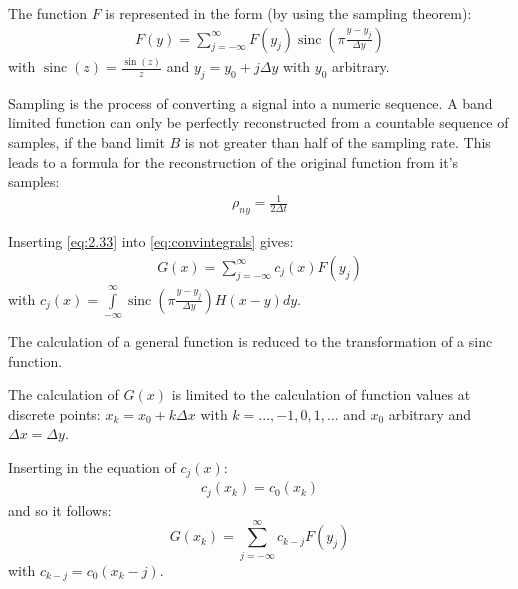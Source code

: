 \begin{compactenum}[1)]
\item The function $F$ is represented in the form (by using the sampling theorem):
\begin{align}
F(y)=\sum_{j=-\infty}^{\infty}F(y_j)\operatorname{sinc}\left(\pi\frac{y-y_j}{\Delta y}\right) \label{eq:2.33}
\end{align}
with $\operatorname{sinc}(z)=\frac{\sin(z)}{z}$ and $y_j=y_0+j\Delta y$ with $y_0$ arbitrary.

Sampling is the process of converting a signal into a numeric sequence. A band limited function can only be perfectly reconstructed from a countable sequence of samples, if the band limit $B$ is not greater than half of the sampling rate. This leads to a formula for the reconstruction of the original function from it's samples:
\begin{align*}
\rho_{ny}=\frac{1}{2\Delta t}
\end{align*}

\item Inserting \eqref{eq:2.33} into \eqref{eq:convintegrals} gives:
\begin{align}
G(x)=\sum_{j=-\infty}^{\infty}c_j(x)F(y_j)
\end{align}
with $c_j(x)=\int\limits_{-\infty}^{\infty}\operatorname{sinc}\left(\pi\frac{y-y_j}{\Delta y}\right)H(x-y)dy$.

The calculation of a general function is reduced to the transformation of a sinc function.\\

\item The calculation of $G(x)$ is limited to the calculation of function values at discrete points: $x_k=x_0+k\Delta x$ with $k=...,-1,0,1,...$ and $x_0$ arbitrary and $\Delta x=\Delta y$.

Inserting in the equation of $c_j(x)$:
\begin{align*}
c_j(x_k)=c_0(x_k)
\end{align*}
and so it follows:
\begin{equation}
G(x_k)=\sum_{j=-\infty}^{\infty}c_{k-j}F(y_j)\label{eq:2.35}
\end{equation}
with $c_{k-j}=c_0(x_k-j)$.


\end{compactenum}

